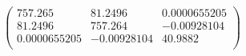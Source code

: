 \documentclass{article}
\begin{document}
\[\left(
\begin{array}{ccc}
 757.265 & 81.2496 & 0.0000655205 \\
 81.2496 & 757.264 & -0.00928104 \\
 0.0000655205 & -0.00928104 & 40.9882 \\
\end{array}
\right)\]
\end{document}
